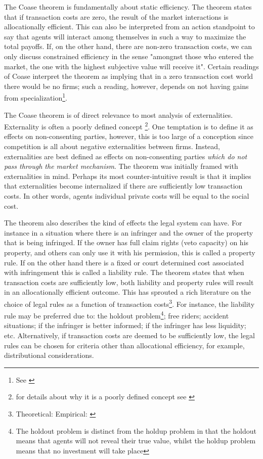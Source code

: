 The Coase theorem is fundamentally about static efficiency. The theorem states that if transaction costs are zero, the result of the market interactions is allocationally efficient. This can also be interpreted from an action standpoint to say that agents will interact among themselves in such a way to maximize the total payoffs. If, on the other hand, there are non-zero transaction costs, we can only discuss constrained efficiency in the sense "amongnst those who entered the market, the one with the highest subjective value will receive it". Certain readings of Coase interpret the theorem  as implying that in a zero transaction cost world there would be no firms; such a reading, however, depends on not having gains from specialization\footnote{See \cite{demsetz2011rh}}.

The Coase theorem is of direct relevance to most analysis of externalities. Externality is often a poorly defined concept \footnote{for details about why it is a poorly defined concept see \cite{Cheung1970}}. One temptation is to define it as effects on non-consenting parties, however, this is too large of a conception since competition is all about negative externalities between firms. Instead, externalities are best defined as effects on non-consenting parties \textit{which do not pass through the market mechanism}. The theorem was initially framed with externalities in mind. Perhaps its most counter-intuitive result is that it implies that externalities become internalized if there are sufficiently low transaction costs. In other words, agents individual private costs will be equal to the social cost.

The theorem also describes the kind of effects the legal system can have. For instance in a situation where there is an infringer and the owner of the property that is being infringed. If the owner has full claim rights (veto capacity) on his property, and others can only use it with his permission, this is called a property rule. If on the other hand there is a fixed or court determined cost associated with infringement this is called a liability rule. The theorem states that when transaction costs are sufficiently low, both liability and property rules will result in an allocationally efficient outcome. This has sprouted a rich literature on the choice of legal rules as a function of transaction costs\footnote{Theoretical: \cite{calabresi1972property} Empirical: \cite{kaplow1995property}}. For instance, the liability rule may be preferred due to: the holdout problem\footnote{The holdout problem is distinct from the holdup problem in that the holdout means that agents will not reveal their true value, whilst the holdup problem means that no investment will take place}; free riders; accident situations; if the infringer is better informed; if the infringer has less liquidity; etc. Alternatively, if transaction costs are deemed to be sufficiently low, the legal rules can be chosen for criteria other than allocational efficiency, for example, distributional considerations.

